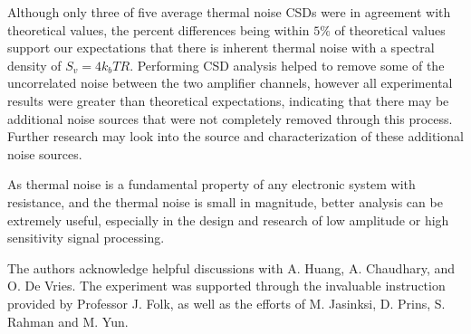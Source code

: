 \documentclass[aps,prl,twocolumn,superscriptaddress]{revtex4-1}
\begin{document}
Although only three of five average thermal noise CSDs were in agreement with theoretical values, the percent differences being within $5\%$ of theoretical values support our expectations that there is inherent thermal noise with a spectral density of $S_v=4k_bTR$. Performing CSD analysis helped to remove some of the uncorrelated noise between the two amplifier channels, however all experimental results were greater than theoretical expectations, indicating that there may be additional noise sources that were not completely removed through this process. Further research may look into the source and characterization of these additional noise sources.

As thermal noise is a fundamental property of any electronic system with resistance, and the thermal noise is small in magnitude, better analysis can be extremely useful, especially in the design and research of low amplitude or high sensitivity signal processing.


\begin{acknowledgments}
The authors acknowledge helpful discussions with A. Huang, A. Chaudhary, and O. De Vries. The experiment was supported through the invaluable instruction provided by Professor J. Folk, as well as the efforts of M. Jasinksi, D. Prins, S. Rahman and M. Yun.
\end{acknowledgments}


\end{document}
